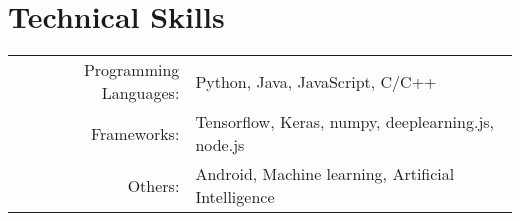 \section{Technical Skills}
\renewcommand{\arraystretch}{1}%
\begin{tabular}{rl}

Programming Languages: &  Python, Java, JavaScript, C/C++ \\
Frameworks: & Tensorflow, Keras, numpy, deeplearning.js, node.js \\
Others: & Android, Machine learning, Artificial Intelligence \\
\end{tabular}
\vspace{2pt}
